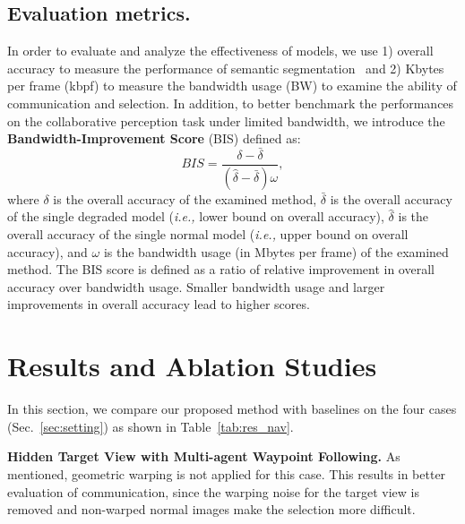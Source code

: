 \subsection{Evaluation metrics.}
In order to evaluate and analyze the effectiveness of models, we use 1) overall accuracy to measure the performance of semantic segmentation~\cite{long2015fully} and 2) Kbytes per frame (kbpf) to measure the bandwidth usage (BW) to examine the ability of communication and selection. 
In addition, to better benchmark the performances on the collaborative perception task under limited bandwidth, we introduce the \textbf{Bandwidth-Improvement Score} (BIS) defined as:
\begin{equation}
    BIS = \dfrac{ \delta -\bar{\delta}}{(\hat{\delta}-\bar{\delta})\omega},
\end{equation}
where $\delta$ is the overall accuracy of the examined method, $\bar{\delta}$ is the overall accuracy of the single degraded model (\textit{i.e.,} lower bound on overall accuracy), $\hat{\delta}$ is the overall accuracy of the single normal model (\textit{i.e.,} upper bound on overall accuracy), and $\omega$ is the bandwidth usage (in Mbytes per frame) of the examined method. The BIS score is defined as a ratio of relative improvement in overall accuracy over bandwidth usage. Smaller bandwidth usage and larger improvements in overall accuracy lead to higher scores. 


 

\section{Results and Ablation Studies}
\label{sec:results-cases}

In this section, we compare our proposed method with baselines on the four cases (Sec.~\ref{sec:setting}) as shown in Table~\ref{tab:res_nav}.

\textbf{ Hidden Target View with Multi-agent Waypoint Following.}
As mentioned, geometric warping is not applied for this case. This results in better evaluation of communication, since the warping noise for the target view is removed and non-warped normal images make the selection more difficult.

